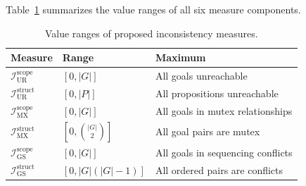 Table~\ref{tab:measure_ranges} summarizes the value ranges of all six measure components.

\begin{table}[ht]
    \centering
    \begin{tabular}{lll}
        \toprule
        Measure                                   & Range                 & Maximum                           \\
        \midrule
        $\mathcal{I}^{\text{scope}}_{\text{UR}}$  & $[0, |G|]$            & All goals unreachable             \\
        $\mathcal{I}^{\text{struct}}_{\text{UR}}$ & $[0, |P|]$            & All propositions unreachable      \\
        $\mathcal{I}^{\text{scope}}_{\text{MX}}$  & $[0, |G|]$            & All goals in mutex relationships  \\
        $\mathcal{I}^{\text{struct}}_{\text{MX}}$ & $[0, \binom{|G|}{2}]$ & All goal pairs are mutex          \\
        $\mathcal{I}^{\text{scope}}_{\text{GS}}$  & $[0, |G|]$            & All goals in sequencing conflicts \\
        $\mathcal{I}^{\text{struct}}_{\text{GS}}$ & $[0, |G|(|G|-1)]$     & All ordered pairs are conflicts   \\
        \bottomrule
    \end{tabular}
    \caption{Value ranges of proposed inconsistency measures.}
    \label{tab:measure_ranges}
\end{table}
